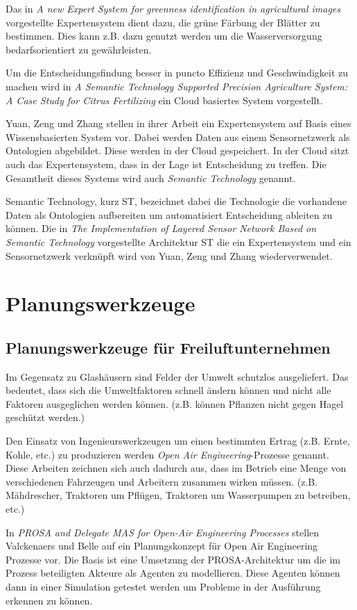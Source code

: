 Das in \textit{A new Expert System for greenness identification in agricultural images} vorgestellte Expertensystem dient dazu, die grüne Färbung der Blätter zu bestimmen. Dies kann z.B. dazu genutzt werden um die Wasserversorgung bedarfsorientiert zu gewährleisten.\cite{jour:Romeo2013}

Um die Entscheidungsfindung besser in puncto Effizienz und Geschwindigkeit zu machen wird in \textit{A Semantic Technology Supported Precision Agriculture System: A Case Study for Citrus Fertilizing} ein Cloud basiertes System vorgestellt. \cite{jour:Yuan2013}

Yuan, Zeng und Zhang stellen in ihrer Arbeit ein Expertensystem auf Basis eines Wissensbasierten System vor. Dabei werden Daten aus einem Sensornetzwerk als Ontologien abgebildet. Diese werden in der Cloud gespeichert. In der Cloud sitzt auch das Expertensystem, dass in der Lage ist Entscheidung zu treffen. Die Gesamtheit dieses Systems wird auch \textit{Semantic Technology} genannt.\cite{jour:Yuan2013}

Semantic Technology, kurz ST, bezeichnet dabei die Technologie die vorhandene Daten als  Ontologien aufbereiten um automatisiert Entscheidung ableiten zu können. Die in \textit{The Implementation of Layered Sensor Network Based on Semantic Technology} vorgestellte Architektur ST die ein Expertensystem und ein Sensornetzwerk verknüpft wird von Yuan, Zeng und Zhang wiederverwendet.\cite{jour:Liu2012}

\section{Planungswerkzeuge}

\subsection{Planungswerkzeuge für Freiluftunternehmen}
Im Gegensatz zu Glashäusern sind Felder der Umwelt schutzlos ausgeliefert. Das bedeutet, dass sich die Umweltfaktoren schnell ändern können und nicht alle Faktoren ausgeglichen werden können. (z.B. können Pflanzen nicht gegen Hagel geschützt werden.)

Den Einsatz von Ingenieurswerkzeugen um einen bestimmten Ertrag (z.B. Ernte, Kohle, etc.) zu produzieren werden \textit{Open Air Engineering}-Prozesse genannt. Diese Arbeiten zeichnen sich auch dadurch aus, dass im Betrieb eine Menge von verschiedenen Fahrzeugen und Arbeitern zusammen wirken müssen. (z.B. Mähdrescher, Traktoren um Pflügen, Traktoren um Wasserpumpen zu betreiben, etc.)

In \textit{PROSA and Delegate MAS for Open-Air Engineering Processes} stellen Valckenaers und Belle auf ein Planungskonzept für Open Air Engineering Prozesse vor. Die Basis ist eine Umsetzung der PROSA-Architektur um die im Prozess beteiligten Akteure als Agenten zu modellieren. Diese Agenten können dann in einer Simulation getestet werden um Probleme in der Ausführung erkennen zu können.\cite{conf:Valckenaers2011}

